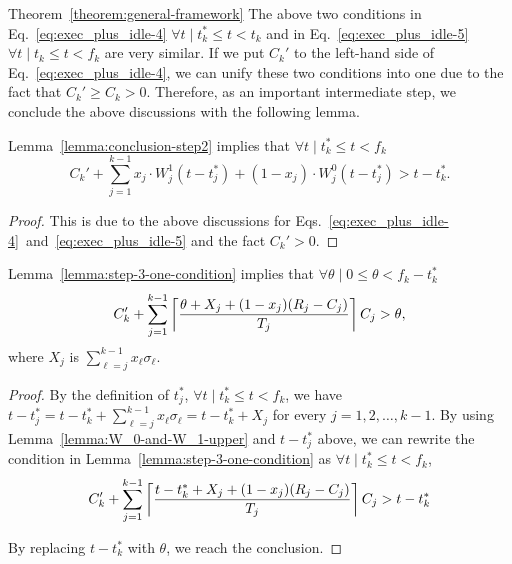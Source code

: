 \begin{appProof}{Theorem~\ref{theorem:general-framework}}
The above two conditions in Eq.~\eqref{eq:exec_plus_idle-4} $\forall t \mid t_k^* \leq t < t_k$ and in Eq.~\eqref{eq:exec_plus_idle-5} $\forall t \mid t_k \leq t < f_k$ are very similar. If we put $C_k'$ to the left-hand side of Eq.~\eqref{eq:exec_plus_idle-4}, we can unify these two conditions into one due to the fact that $C_k' \geq C_k > 0$. Therefore, as an important intermediate step, we conclude the above discussions with the following lemma.

\begin{Lemma}
\label{lemma:step-3-one-condition}
Lemma~\ref{lemma:conclusion-step2} implies that
$\forall t \mid t_k^* \leq t < f_k$
\begin{equation}
\label{eq:exec_plus_idle-almost-final} 
C_k'+\sum_{j=1}^{k-1} x_j\cdot W_j^1(t-t_j^*) + (1-x_j)\cdot W_j^0(t-t_j^*) > t-t_k^*.
\end{equation}  
\end{Lemma}
\begin{proof}
  This is due to the above discussions for Eqs.~\eqref{eq:exec_plus_idle-4}~and~\eqref{eq:exec_plus_idle-5} and the fact $C_k' > 0$.
\end{proof}

\begin{Lemma}
\label{lemma:step-3-ceiling-condition}
Lemma~\ref{lemma:step-3-one-condition} implies that
$\forall \theta \mid 0 \leq \theta < f_k-t_k^*$
\begin{equation}
\label{eq:exec_plus_idle-almost-final-before-replacing-sigma} 
C_k'+\sum_{j=1}^{k-1} \ceiling{\frac{\theta+X_j+(1-x_j)(R_j-C_j)}{T_j}} C_j > \theta,
\end{equation}
where $X_j$ is $\sum_{\ell=j}^{k-1} x_\ell\sigma_\ell$. 
\end{Lemma}
\begin{proof}
  By the definition of $t_j^*$, $\forall t \mid t_k^* \leq t < f_k$,
  we have $t-t_j^* = t - t_k^* + \sum_{\ell=j}^{k-1}
  x_\ell\sigma_\ell = t-t_k^* + X_j$ for every $j=1,2,\ldots,k-1$. By using Lemma~\ref{lemma:W_0-and-W_1-upper} and $t-t_j^*$ above, we can rewrite the condition in Lemma~\ref{lemma:step-3-one-condition} as $\forall t \mid t_k^* \leq t < f_k$,
\begin{equation*}
C_k'+\sum_{j=1}^{k-1} \left\lceil{\frac{t-t_k^*+X_j+(1-x_j)(R_j-C_j)}{T_j}}\right\rceil C_j > t-t_k^*
\end{equation*}

  By replacing $t-t_k^*$ with $\theta$, we reach the conclusion.
\end{proof}


\end{appProof}

